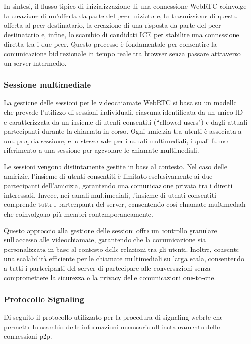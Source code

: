 In sintesi, il flusso tipico di inizializzazione di una connessione WebRTC coinvolge la creazione di un'offerta da parte del peer iniziatore, la trasmissione di questa offerta al peer destinatario, la creazione di una risposta da parte del peer destinatario e, infine, lo scambio di candidati ICE per stabilire una connessione diretta tra i due peer.
%
Questo processo è fondamentale per consentire la comunicazione bidirezionale in tempo reale tra browser senza passare attraverso un server intermedio.

%
%
%
\subsubsection{Sessione multimediale}
La gestione delle sessioni per le videochiamate WebRTC si basa su un modello che prevede l'utilizzo di sessioni individuali, ciascuna identificata da un unico ID e caratterizzata da un insieme di utenti consentiti (“allowed users") e dagli attuali partecipanti durante la chiamata in corso.
%
Ogni amicizia tra utenti è associata a una propria sessione, e lo stesso vale per i canali multimediali, i quali fanno riferimento a una sessione per agevolare le chiamate multimediali.

Le sessioni vengono distintamente gestite in base al contesto.
%
Nel caso delle amicizie, l'insieme di utenti consentiti è limitato esclusivamente ai due partecipanti dell'amicizia, garantendo una comunicazione privata tra i diretti interessati.
%
Invece, nei canali multimediali, l'insieme di utenti consentiti comprende tutti i partecipanti del server, consentendo così chiamate multimediali che coinvolgono più membri contemporaneamente.

Questo approccio alla gestione delle sessioni offre un controllo granulare sull'accesso alle videochiamate, garantendo che la comunicazione sia personalizzata in base al contesto delle relazioni tra gli utenti.
%
Inoltre, consente una scalabilità efficiente per le chiamate multimediali su larga scala, consentendo a tutti i partecipanti del server di partecipare alle conversazioni senza compromettere la sicurezza o la privacy delle comunicazioni one-to-one.

%
%
%
\subsubsection{Protocollo Signaling}

Di seguito il protocollo utilizzato per la procedura di signaling webrtc che permette lo scambio delle informazioni necessarie all instauramento delle connessioni p2p. 

